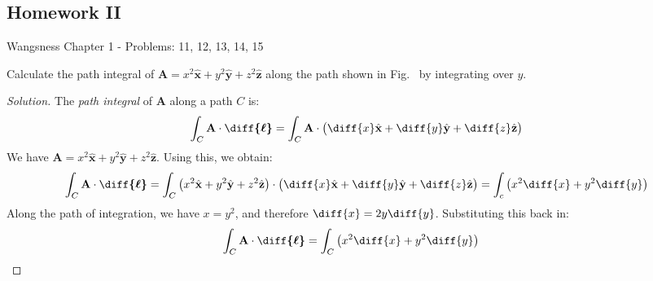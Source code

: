 \documentclass[crop=false,class=book,oneside]{standalone}
\begin{document}
        \subsection{Homework II}
            Wangsness Chapter 1 - Problems: 11, 12, 13, 14, 15
            \begin{problem}[Wangsness 1-11]
                \label{problem:EMAG_1_Wangsness_1_11}
                Calculate the path integral of
                $\mathbf{A}=x^{2}\hat{\mathbf{x}}
                +y^{2}\hat{\mathbf{y}}+z^{2}\hat{\mathbf{z}}$
                along the path shown in Fig.~
                by integrating over $y$.
            \end{problem}
            \begin{proof}[Solution]
                The \textit{path integral} of $\mathbf{A}$
                along a path $C$ is:
                \begin{equation*}
                    \int_{C}\mathbf{A}\cdot\boldsymbol{\diff{\ell}}
                    =\int_{C}\mathbf{A}\cdot\big(
                        \diff{x}\hat{\mathbf{x}}
                       +\diff{y}\hat{\mathbf{y}}
                       +\diff{z}\hat{\mathbf{z}}
                    \big)
                \end{equation*}
                We have
                $\mathbf{A}%
                 =x^{2}\hat{\mathbf{x}}%
                 +y^{2}\hat{\mathbf{y}}%
                 +z^{2}\hat{\mathbf{z}}$.
                Using this, we obtain:
                \begin{equation*}
                    \int_{C}\mathbf{A}\cdot\boldsymbol{\diff{\ell}}
                    =\int_{C}\big(
                        x^{2}\hat{\mathbf{x}}+y^{2}
                        \hat{\mathbf{y}}+z^{2}\hat{\mathbf{z}}
                    \big)
                    \cdot\big(
                         \diff{x}\hat{\mathbf{x}}
                        +\diff{y}\hat{\mathbf{y}}
                        +\diff{z}\hat{\mathbf{z}}
                    \big)
                    =\int_{c}\big(x^{2}\diff{x}+y^{2}\diff{y}\big)
                \end{equation*}
                Along the path of integration, we have $x=y^{2}$,
                and therefore $\diff{x}=2y\diff{y}$.
                Substituting this back in:
                \begin{align*}
                    \int_{C}\mathbf{A}\cdot\boldsymbol{\diff{\ell}}
                    &=\int_{C}\big(x^{2}\diff{x}+y^{2}\diff{y}\big)

\end{align*}
\end{proof}
\end{document}
